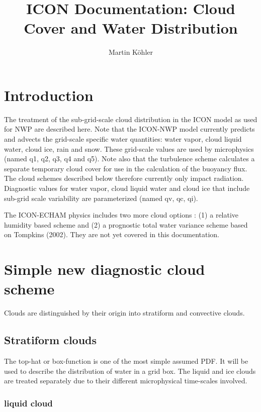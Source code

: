 \documentclass[a4paper,11pt]{article}
\author{Martin K\"{o}hler}
\title{ICON Documentation: Cloud Cover and Water Distribution}
\begin{document}
  \maketitle


\section{Introduction}

The treatment of the sub-grid-scale cloud distribution 
in the ICON model as used for NWP are described here.  Note that the ICON-NWP
model currently predicts and advects the grid-scale specific water quantities: 
water vapor, cloud liquid water, cloud ice, rain and snow.  These grid-scale
values are used by microphysics (named q1, q2, q3, q4 and q5).  
Note also that the turbulence scheme 
calculates a separate temporary cloud
cover for use in the calculation of the buoyancy flux.
The cloud schemes described below therefore currently only impact radiation.
Diagnostic values for water vapor, cloud liquid water and cloud ice that include
sub-grid scale variability are parameterized (named qv, qc, qi).

The ICON-ECHAM physics includes two more cloud options : 
(1) a relative humidity based scheme and (2) a prognostic
total water variance scheme based on Tompkins (2002). 
They are not yet covered 
in this documentation.



\section{Simple new diagnostic cloud scheme}
\label{sc:diag}

Clouds are distinguished by their origin into stratiform and convective clouds.

\subsection{Stratiform clouds}

The top-hat or box-function is one of the most simple assumed PDF.  It will be 
used to describe the distribution of water in a grid box.  The liquid and ice 
clouds are treated separately due to their different microphysical time-scales 
involved. 

\subsubsection{liquid cloud}
\end{document}
